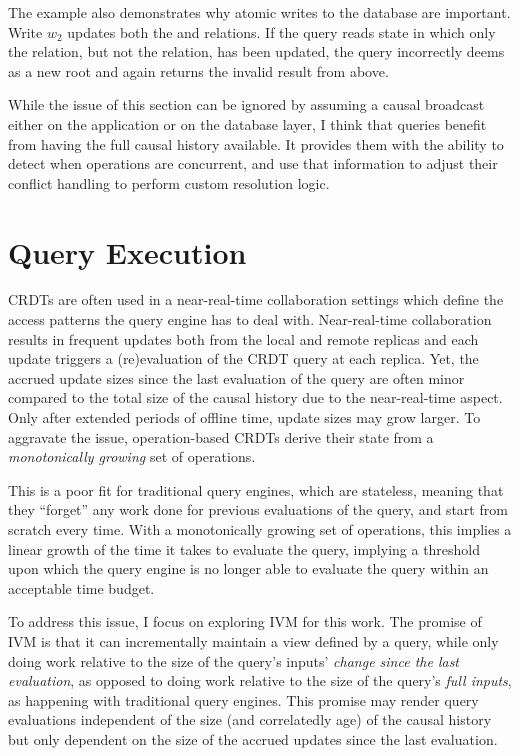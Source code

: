 The example also demonstrates why atomic writes to the database are important.
Write \(w_2\) updates both the  and  relations.
If the query reads state in which only the  relation,
but not the  relation, has been updated,
the query incorrectly deems  as a new root and
again returns the invalid result from above.

While the issue of this section can be ignored by assuming a causal broadcast
either on the application or on the database layer,
I think that queries benefit from having the full causal history available.
It provides them with the ability to detect when operations are concurrent,
and use that information to adjust their conflict handling to perform
custom resolution logic.

\section{Query Execution}

\acp{CRDT} are often used in a near-real-time collaboration settings which
define the access patterns the query engine has to deal with.
Near-real-time collaboration results in frequent updates both from the local
and remote replicas and each update triggers a (re)evaluation of the
\ac{CRDT} query at each replica.
Yet, the accrued update sizes since the last evaluation of the query are
often minor compared to the total size of the causal history due to the
near-real-time aspect.
Only after extended periods of offline time, update sizes may grow larger.
To aggravate the issue, operation-based \acp{CRDT} derive their state from a
\emph{monotonically growing} set of operations.

This is a poor fit for traditional query engines, which are stateless,
meaning that they ``forget'' any work done for previous evaluations of the query,
and start from scratch every time.
With a monotonically growing set of operations, this implies a linear
growth of the time it takes to evaluate the query, implying a threshold
upon which the query engine is no longer able to evaluate the query within
an acceptable time budget.

To address this issue, I focus on exploring \ac{IVM} for this work.
The promise of \ac{IVM} is that it can incrementally maintain a view defined
by a query, while only doing work relative to the size of the query's
inputs' \emph{change since the last evaluation}, as opposed to doing work
relative to the size of the query's \emph{full inputs},
as happening with traditional query engines.
This promise may render query evaluations independent of the size
(and correlatedly age) of the causal history but only dependent on the
size of the accrued updates since the last evaluation.

